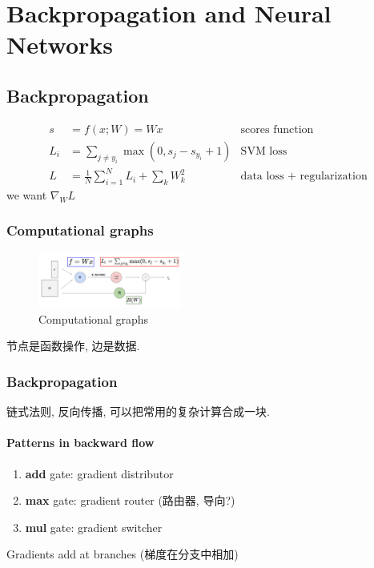 \newpage
\section{Backpropagation and Neural Networks}
\subsection{Backpropagation}

\begin{align*}
    s&=f(x;W)=Wx &\text{scores function}\\
    L_i&=\sum_{j\ne y_i}\max (0, s_j-s_{y_i}+1) &\text{SVM loss}\\
    L&=\frac{1}{N}\sum_{i=1}^N L_i+\sum_k W_k^2 &\text{data loss + regularization}
\end{align*}
we want $\nabla_W L$

\subsubsection{Computational graphs}
\begin{figure}[!htb]
    \centering
    \includegraphics[width=0.42\textwidth]{pic/Lec4/Computational graphs}
    \caption{Computational graphs}
\end{figure}

节点是函数操作, 边是数据. 

\subsubsection{Backpropagation}
链式法则, 反向传播, 可以把常用的复杂计算合成一块. 
\paragraph{Patterns in backward flow}
\begin{enumerate}
    \item \textbf{add} gate: gradient distributor
    \item \textbf{max} gate: gradient router (路由器, 导向?)
    \item \textbf{mul} gate: gradient switcher
\end{enumerate}

Gradients add at branches (梯度在分支中相加)

